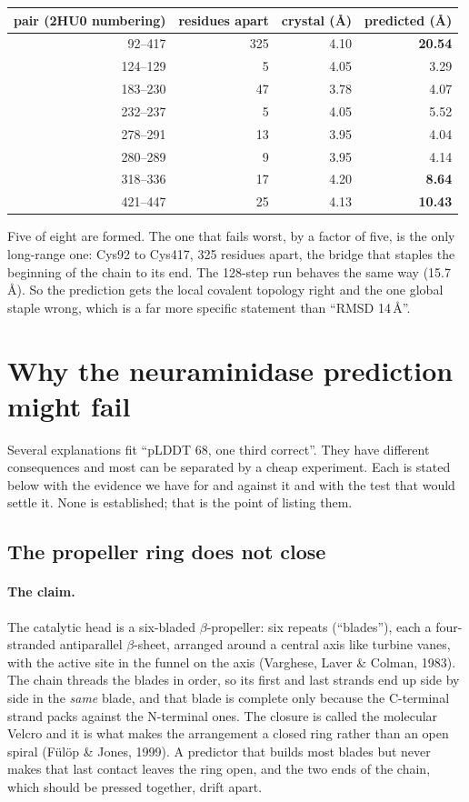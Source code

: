 \documentclass[11pt,a4paper]{article}
\begin{document}
\begin{center}
\begin{tabular}{rrrr}
\toprule
pair (2HU0 numbering) & residues apart & crystal (\AA) & predicted (\AA) \\
\midrule
92--417  & 325 & 4.10 & \textbf{20.54} \\
124--129 & 5   & 4.05 & 3.29 \\
183--230 & 47  & 3.78 & 4.07 \\
232--237 & 5   & 4.05 & 5.52 \\
278--291 & 13  & 3.95 & 4.04 \\
280--289 & 9   & 3.95 & 4.14 \\
318--336 & 17  & 4.20 & \textbf{8.64} \\
421--447 & 25  & 4.13 & \textbf{10.43} \\
\bottomrule
\end{tabular}
\end{center}

Five of eight are formed. The one that fails worst, by a factor of five, is the
only long-range one: Cys92 to Cys417, 325 residues apart, the bridge that staples
the beginning of the chain to its end. The 128-step run behaves the same way
(15.7\,\AA). So the prediction gets the local covalent topology right and the one
global staple wrong, which is a far more specific statement than ``RMSD
14\,\AA''.

\section{Why the neuraminidase prediction might fail}\label{sec:why}

Several explanations fit ``pLDDT 68, one third correct''. They have different
consequences and most can be separated by a cheap experiment. Each is stated
below with the evidence we have for and against it and with the test that would
settle it. None is established; that is the point of listing them.

\subsection{The propeller ring does not close}

\paragraph{The claim.} The catalytic head is a six-bladed $\beta$-propeller: six
repeats (``blades''), each a four-stranded antiparallel $\beta$-sheet, arranged
around a central axis like turbine vanes, with the active site in the funnel on
the axis (Varghese, Laver \& Colman, 1983). The chain threads the blades in
order, so its first and last strands end up side by side in the \emph{same}
blade, and that blade is complete only because the C-terminal strand packs
against the N-terminal ones. The closure is called the molecular Velcro and it is
what makes the arrangement a closed ring rather than an open spiral (F\"ul\"op \&
Jones, 1999). A predictor that builds most blades but never makes that last
contact leaves the ring open, and the two ends of the chain, which should be
pressed together, drift apart.
\end{document}
